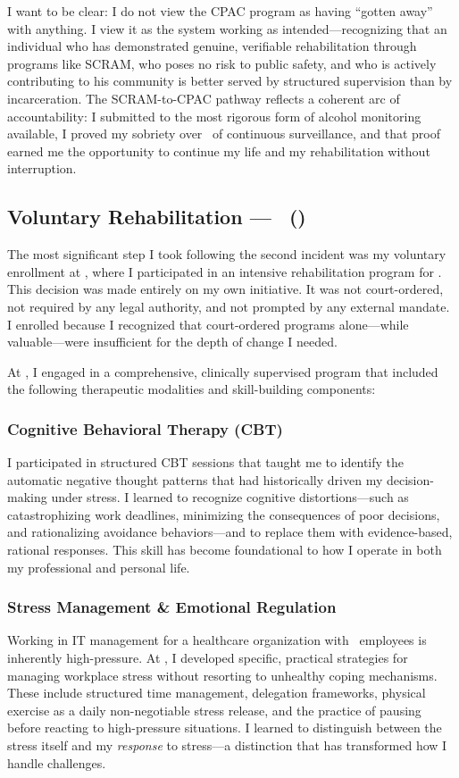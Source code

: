 I want to be clear: I do not view the CPAC program as having ``gotten away'' with anything. I view it as the system working as intended---recognizing that an individual who has demonstrated genuine, verifiable rehabilitation through programs like SCRAM, who poses no risk to public safety, and who is actively contributing to his community is better served by structured supervision than by incarceration. The SCRAM-to-CPAC pathway reflects a coherent arc of accountability: I submitted to the most rigorous form of alcohol monitoring available, I proved my sobriety over \SCRAMDuration\ of continuous surveillance, and that proof earned me the opportunity to continue my life and my rehabilitation without interruption.

\subsection{Voluntary Rehabilitation --- \RehabProgram\ (\RehabDuration)}

The most significant step I took following the second incident was my voluntary enrollment at \textbf{\RehabProgram}, where I participated in an intensive rehabilitation program for \RehabDuration. This decision was made entirely on my own initiative. It was not court-ordered, not required by any legal authority, and not prompted by any external mandate. I enrolled because I recognized that court-ordered programs alone---while valuable---were insufficient for the depth of change I needed.

At \RehabProgram, I engaged in a comprehensive, clinically supervised program that included the following therapeutic modalities and skill-building components:

\subsubsection{Cognitive Behavioral Therapy (CBT)}
I participated in structured CBT sessions that taught me to identify the automatic negative thought patterns that had historically driven my decision-making under stress. I learned to recognize cognitive distortions---such as catastrophizing work deadlines, minimizing the consequences of poor decisions, and rationalizing avoidance behaviors---and to replace them with evidence-based, rational responses. This skill has become foundational to how I operate in both my professional and personal life.

\subsubsection{Stress Management \& Emotional Regulation}
Working in IT management for a healthcare organization with \TeamSize\ employees is inherently high-pressure. At \RehabProgram, I developed specific, practical strategies for managing workplace stress without resorting to unhealthy coping mechanisms. These include structured time management, delegation frameworks, physical exercise as a daily non-negotiable stress release, and the practice of pausing before reacting to high-pressure situations. I learned to distinguish between the stress itself and my \textit{response} to stress---a distinction that has transformed how I handle challenges.

